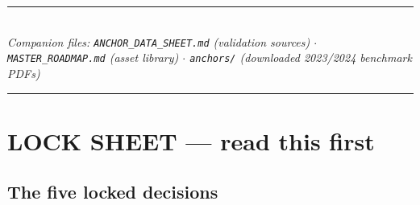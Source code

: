 \documentclass[11pt,a4paper]{article}
\begin{document}
\begin{titlepage}
\vfill
{\color{accent}\rule{\textwidth}{0.6pt}}\\[0.35cm]
{\footnotesize\itshape Companion files: \texttt{ANCHOR\_DATA\_SHEET.md} (validation sources) $\cdot$
\texttt{MASTER\_ROADMAP.md} (asset library) $\cdot$
\texttt{anchors/} (downloaded 2023/2024 benchmark PDFs)}\\[0.3cm]
{\color{accent}\rule{\textwidth}{1.2pt}}
\end{titlepage}

\tableofcontents
\newpage

\section{LOCK SHEET --- read this first}

\subsection{The five locked decisions}
\end{document}
